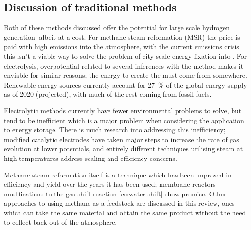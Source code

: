 \subsection{Discussion of traditional methods}%
\label{sub:discussion_of_traditional_methods}
Both of these methods discussed offer the potential for large scale hydrogen generation; albeit at a cost.
For methane steam reformation (MSR) the price is paid with high emissions into the atmosphere, with the current  emissions crisis this isn't a viable way to solve the problem of city-scale energy fixation into .
For electrolysis, overpotential related to several inferences with the method makes it enviable for similar reasons; the energy to create the  must come from somewhere.
Renewable energy sources currently account for \SI{27}{\percent} of the global energy supply as of 2020\cite{IEA2020} (projected), with much of the rest coming from fossil fuels.

Electrolytic methods currently have fewer environmental problems to solve, but tend to be inefficient which is a major problem when considering the application to energy storage.
There is much research into addressing this inefficiency; modified catalytic electrodes have taken major steps to increase the rate of gas evolution at lower potentials, and entirely different techniques utilising steam at high temperatures address scaling and efficiency concerns.

Methane steam reformation itself is a technique which has been improved in efficiency and yield over the years it has been used; membrane reactors \cite{} modifications to the gas-shift reaction \eqref{ce:water-shift}\cite{Saxena2011} show promise.
Other approaches to using methane as a feedstock are discussed in this review, ones which can take the same material and obtain the same product without the need to collect  back out of the atmosphere.
